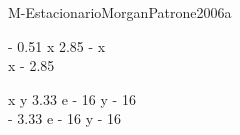 
\begin{bilevelmodel}{M-Estacionario}{MorganPatrone2006a}
    \begin{upperlevel}{- 0.51 x}{
         2.85 - x  \\ 
 x - 2.85 
    }
    \end{upperlevel}
    \begin{lowerlevel}{x y}{
         3.33 e - 16 y - 16  \\ 
 - 3.33 e - 16 y - 16 
    }
    \end{lowerlevel}
\end{bilevelmodel}
    
        